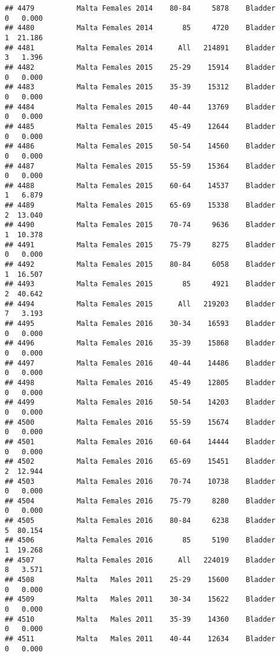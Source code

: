 \documentclass[
]{article}
\begin{document}
\begin{verbatim}
## 4479          Malta Females 2014    80-84     5878    Bladder      0   0.000
## 4480          Malta Females 2014       85     4720    Bladder      1  21.186
## 4481          Malta Females 2014      All   214891    Bladder      3   1.396
## 4482          Malta Females 2015    25-29    15914    Bladder      0   0.000
## 4483          Malta Females 2015    35-39    15312    Bladder      0   0.000
## 4484          Malta Females 2015    40-44    13769    Bladder      0   0.000
## 4485          Malta Females 2015    45-49    12644    Bladder      0   0.000
## 4486          Malta Females 2015    50-54    14560    Bladder      0   0.000
## 4487          Malta Females 2015    55-59    15364    Bladder      0   0.000
## 4488          Malta Females 2015    60-64    14537    Bladder      1   6.879
## 4489          Malta Females 2015    65-69    15338    Bladder      2  13.040
## 4490          Malta Females 2015    70-74     9636    Bladder      1  10.378
## 4491          Malta Females 2015    75-79     8275    Bladder      0   0.000
## 4492          Malta Females 2015    80-84     6058    Bladder      1  16.507
## 4493          Malta Females 2015       85     4921    Bladder      2  40.642
## 4494          Malta Females 2015      All   219203    Bladder      7   3.193
## 4495          Malta Females 2016    30-34    16593    Bladder      0   0.000
## 4496          Malta Females 2016    35-39    15868    Bladder      0   0.000
## 4497          Malta Females 2016    40-44    14486    Bladder      0   0.000
## 4498          Malta Females 2016    45-49    12805    Bladder      0   0.000
## 4499          Malta Females 2016    50-54    14203    Bladder      0   0.000
## 4500          Malta Females 2016    55-59    15674    Bladder      0   0.000
## 4501          Malta Females 2016    60-64    14444    Bladder      0   0.000
## 4502          Malta Females 2016    65-69    15451    Bladder      2  12.944
## 4503          Malta Females 2016    70-74    10738    Bladder      0   0.000
## 4504          Malta Females 2016    75-79     8280    Bladder      0   0.000
## 4505          Malta Females 2016    80-84     6238    Bladder      5  80.154
## 4506          Malta Females 2016       85     5190    Bladder      1  19.268
## 4507          Malta Females 2016      All   224019    Bladder      8   3.571
## 4508          Malta   Males 2011    25-29    15600    Bladder      0   0.000
## 4509          Malta   Males 2011    30-34    15622    Bladder      0   0.000
## 4510          Malta   Males 2011    35-39    14360    Bladder      0   0.000
## 4511          Malta   Males 2011    40-44    12634    Bladder      0   0.000

\end{verbatim}
\end{document}
